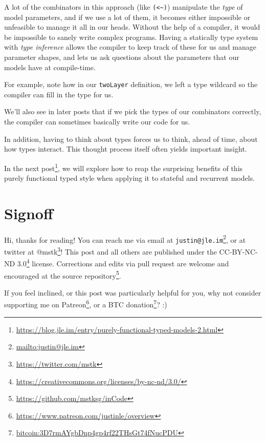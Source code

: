 \documentclass[]{article}
\renewcommand{\href}[2]{#2\footnote{\url{#1}}}
\begin{document}
\begin{enumerate}
  A lot of the combinators in this approach (like
  \texttt{(\textless{}\textasciitilde{})}) manipulate the \emph{type} of model
  parameters, and if we use a lot of them, it becomes either impossible or
  unfeasible to manage it all in our heads. Without the help of a compiler, it
  would be impossible to sanely write complex programs. Having a statically type
  system with \emph{type inference} allows the compiler to keep track of these
  for us and manage parameter shapes, and lets us ask questions about the
  parameters that our models have at compile-time.

  For example, note how in our \texttt{twoLayer} definition, we left a type
  wildcard so the compiler can fill in the type for us.

  We'll also see in later posts that if we pick the types of our combinators
  correctly, the compiler can sometimes basically write our code for us.

  In addition, having to think about types forces us to think, ahead of time,
  about how types interact. This thought process itself often yields important
  insight.
\end{enumerate}

In the
\href{https://blog.jle.im/entry/purely-functional-typed-models-2.html}{next
post}, we will explore how to reap the surprising benefits of this purely
functional typed style when applying it to stateful and recurrent models.

\section{Signoff}\label{signoff}

Hi, thanks for reading! You can reach me via email at
\href{mailto:justin@jle.im}{\nolinkurl{justin@jle.im}}, or at twitter at
\href{https://twitter.com/mstk}{@mstk}! This post and all others are published
under the \href{https://creativecommons.org/licenses/by-nc-nd/3.0/}{CC-BY-NC-ND
3.0} license. Corrections and edits via pull request are welcome and encouraged
at \href{https://github.com/mstksg/inCode}{the source repository}.

If you feel inclined, or this post was particularly helpful for you, why not
consider \href{https://www.patreon.com/justinle/overview}{supporting me on
Patreon}, or a \href{bitcoin:3D7rmAYgbDnp4gp4rf22THsGt74fNucPDU}{BTC donation}?
:)
\end{document}
